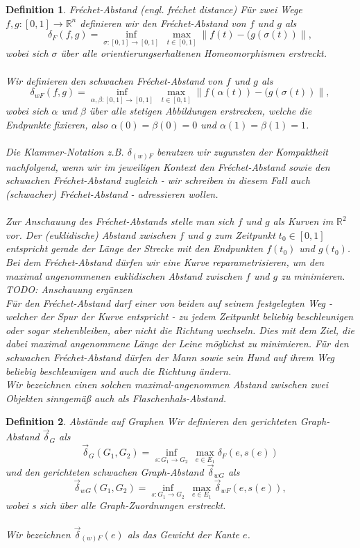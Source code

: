 \documentclass[a4paper, 12pt, twoside]{article}
\theoremstyle{Format1} %
\newtheorem{Def}{Definition}[section]       %
\begin{document}
\begin{Def}
	Fréchet-Abstand (engl. fréchet distance)
	Für zwei Wege $ f, g: [0,1] \to \mathbb{R}^n $ definieren wir den \textit{Fréchet-Abstand} von $f$ und $g$ als
	$$ \delta_F(f,g) =  \inf_{\sigma:[0,1] \to [0,1]} \; \max_{t \in [0,1]} \lVert f(t)-(g(\sigma(t)) \rVert, $$
	wobei sich $\sigma $ über alle orientierungserhaltenen Homeomorphismen erstreckt.
	\\
	\\
	Wir definieren den \textit{schwachen Fréchet-Abstand} von $f$ und $g$ als
	$$\delta_{wF}(f,g) =\inf_{\alpha , \beta :[0,1] \to [0,1]} \; \max_{t \in [0,1]} \lVert f(\alpha(t))-(g(\sigma(t)) \rVert,$$
	wobei sich $\alpha$ und $\beta$ über alle stetigen Abbildungen erstrecken, welche die Endpunkte fixieren, also $\alpha(0) = \beta(0) = 0$
	und $\alpha(1) = \beta(1) = 1$.
	\\
	\\
	Die Klammer-Notation z.B. $ \delta_{(w)F} $ benutzen wir zugunsten der Kompaktheit nachfolgend, wenn wir im jeweiligen Kontext den Fréchet-Abstand sowie den schwachen Fréchet-Abstand zugleich -
	wir schreiben in diesem Fall auch \textit{(schwacher) Fréchet-Abstand} - adressieren wollen.
	\\
	\\
	Zur Anschauung des Fréchet-Abstands stelle man sich $f$ und $g$ als Kurven im $\mathbb{R}^2$ vor. Der (euklidische) Abstand zwischen $f$ und $g$ zum Zeitpunkt $t_0 \in [0,1]$ entspricht gerade der Länge der Strecke
	mit den Endpunkten $f(t_0)$ und $g(t_0)$. Bei dem Fréchet-Abstand dürfen wir eine Kurve reparametrisieren, um den maximal angenommenen euklidischen Abstand zwischen $f$ und $g$ zu minimieren.
	TODO: Anschauung ergänzen
	\\
	Für den Fréchet-Abstand darf einer von beiden auf seinem festgelegten Weg - welcher der Spur der Kurve entspricht - zu jedem Zeitpunkt beliebig beschleunigen oder sogar stehenbleiben, aber nicht die Richtung wechseln.
	Dies mit dem Ziel, die dabei maximal angenommene Länge der Leine möglichst zu minimieren.
	Für den schwachen Fréchet-Abstand dürfen der Mann sowie sein Hund auf ihrem Weg beliebig beschleunigen und auch die Richtung ändern.
	\\
	Wir bezeichnen einen solchen maximal-angenommen Abstand zwischen zwei Objekten sinngemäß auch als \textit{Flaschenhals-Abstand}.
	\\
\end{Def}

\begin{Def}
	Abstände auf Graphen
	Wir definieren den \textit{gerichteten Graph-Abstand} $ \vec{\delta}_G $ als
	$$ \vec{\delta}_G(G_1,G_2) = \inf_{s: G_1 \to G_2} \: \max_{e \in E_1} \delta_F(e, s(e)) $$
	und den \textit{gerichteten schwachen Graph-Abstand} $ \vec{\delta}_{wG} $ als
	$$  \vec{\delta}_{wG}(G_1,G_2) = \inf_{s: G_1 \to G_2} \: \max_{e \in E_1} \vec{\delta}_{wF}(e, s(e)), $$
	wobei s sich über alle Graph-Zuordnungen erstreckt.
	\\
	\\
	Wir bezeichnen $\vec{\delta}_{(w)F}(e)$ als das \textit{Gewicht} der Kante $e$.
\end{Def}
\end{document}
